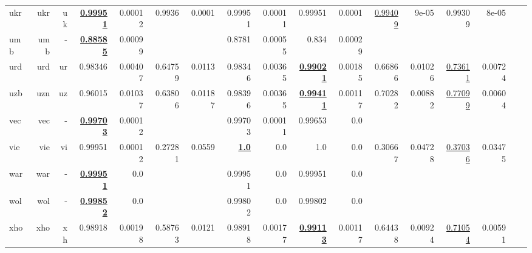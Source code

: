 \documentclass[11pt]{article}
\begin{document}
\begin{table*}[h]
{\begin{tabular}{lrrrrrrrrrrrrrrrr}
ukr         & ukr         & uk         & \textbf{\underline{0.99951}}         & 0.00012         & 0.9936         & 0.0001         & 0.99951         & 0.00011         & 0.99951         & 0.0001         & \underline{0.99409}         & 9e-05         & 0.99309         & 8e-05         \\
umb         & umb         & -         & \textbf{\underline{0.88585}}         & 0.00099         &          &          & 0.8781         & 0.00055         & 0.834         & 0.00029         &          &          &          &          \\
urd         & urd         & ur         & 0.98346         & 0.00407         & 0.64759         & 0.0113         & 0.98346         & 0.00365         & \textbf{\underline{0.99021}}         & 0.00185         & 0.66866         & 0.01026         & \underline{0.73611}         & 0.00724         \\
uzb         & uzn         & uz         & 0.96015         & 0.01037         & 0.63806         & 0.01187         & 0.98396         & 0.00365         & \textbf{\underline{0.99411}}         & 0.00117         & 0.70282         & 0.00882         & \underline{0.77099}         & 0.00604         \\
vec         & vec         & -         & \textbf{\underline{0.99703}}         & 0.00012         &          &          & 0.99703         & 0.00011         & 0.99653         & 0.0         &          &          &          &          \\
vie         & vie         & vi         & 0.99951         & 0.00012         & 0.27281         & 0.0559         & \textbf{\underline{1.0}}         & 0.0         & 1.0         & 0.0         & 0.30667         & 0.04728         & \underline{0.37036}         & 0.03475         \\
war         & war         & -         & \textbf{\underline{0.99951}}         & 0.0         &          &          & 0.99951         & 0.0         & 0.99951         & 0.0         &          &          &          &          \\
wol         & wol         & -         & \textbf{\underline{0.99852}}         & 0.0         &          &          & 0.99802         & 0.0         & 0.99802         & 0.0         &          &          &          &          \\
xho         & xho         & xh         & 0.98918         & 0.00198         & 0.58763         & 0.0121         & 0.98918         & 0.00177         & \textbf{\underline{0.99113}}         & 0.00117         & 0.64438         & 0.00924         & \underline{0.71054}         & 0.00591         \\

\end{tabular}}
\end{table*}
\end{document}

